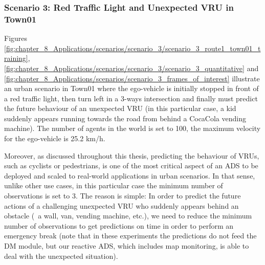 
\subsubsection{Scenario 3: Red Traffic Light and Unexpected \ac{VRU} in Town01}
\label{subsubsec:8_experimental_results_scenario_3}

Figures \ref{fig:chapter_8_Applications/scenarios/scenario_3/scenario_3_route1_town01_training}, \ref{fig:chapter_8_Applications/scenarios/scenario_3/scenario_3_quantitative} and \ref{fig:chapter_8_Applications/scenarios/scenario_3_frames_of_interest} illustrate an urban scenario in Town01 where the ego-vehicle is initially stopped in front of a red traffic light, then turn left in a 3-ways intersection and finally must predict the future behaviour of an unexpected \ac{VRU} (in this particular case, a kid suddenly appears running towards the road from behind a CocaCola vending machine). The number of agents in the world is set to 100, the maximum velocity for the ego-vehicle is 25.2 km/h.

Moreover, as discussed throughout this thesis, predicting the behaviour of \acp{VRU}, such as cyclists or pedestrians, is one of the most critical aspect of an \ac{ADS} to be deployed and scaled to real-world applications in urban scenarios. In that sense, unlike other use cases, in this particular case the minimum number of observations is set to 3. The reason is simple: In order to predict the future actions of a challenging unexpected \ac{VRU} who suddenly appears behind an obstacle (\eg \ a wall, van, vending machine, etc.), we need to reduce the minimum number of observations to get predictions on time in order to perform an emergency break (note that in these experiments the predictions do not feed the \ac{DM} module, but our reactive \ac{ADS}, which includes map monitoring, is able to deal with the unexpected situation).

